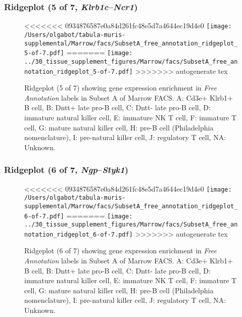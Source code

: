 \subsubsection{Ridgeplot (5 of 7, \emph{Klrb1c}--\emph{Ncr1})}
\begin{figure}[h]
\centering
<<<<<<< 0934876587e0a84d261fc48e5d7a4644ec19d4e0
\texttt{[image: /Users/olgabot/tabula-muris-supplemental/Marrow/facs/SubsetA\_free\_annotation\_ridgeplot\_5-of-7.pdf]}
=======
\texttt{[image: ../30\_tissue\_supplement\_figures/Marrow/facs/SubsetA\_free\_annotation\_ridgeplot\_5-of-7.pdf]}
>>>>>>> autogenerate tex

\caption{ Ridgeplot (5 of 7)  showing gene expression enrichment in \emph{Free Annotation} labels in Subset A of Marrow FACS. A: Cd3e+ Klrb1+ B cell, B: Dntt+ late pro-B cell, C: Dntt- late pro-B cell, D: immature natural killer cell, E: immature NK T cell, F: immature T cell, G: mature natural killer cell, H: pre-B cell (Philadelphia nomenclature), I: pre-natural killer cell, J: regulatory T cell, NA: Unknown.}
\end{figure}


\clearpage

\subsubsection{Ridgeplot (6 of 7, \emph{Ngp}--\emph{Styk1})}
\begin{figure}[h]
\centering
<<<<<<< 0934876587e0a84d261fc48e5d7a4644ec19d4e0
\texttt{[image: /Users/olgabot/tabula-muris-supplemental/Marrow/facs/SubsetA\_free\_annotation\_ridgeplot\_6-of-7.pdf]}
=======
\texttt{[image: ../30\_tissue\_supplement\_figures/Marrow/facs/SubsetA\_free\_annotation\_ridgeplot\_6-of-7.pdf]}
>>>>>>> autogenerate tex

\caption{ Ridgeplot (6 of 7)  showing gene expression enrichment in \emph{Free Annotation} labels in Subset A of Marrow FACS. A: Cd3e+ Klrb1+ B cell, B: Dntt+ late pro-B cell, C: Dntt- late pro-B cell, D: immature natural killer cell, E: immature NK T cell, F: immature T cell, G: mature natural killer cell, H: pre-B cell (Philadelphia nomenclature), I: pre-natural killer cell, J: regulatory T cell, NA: Unknown.}
\end{figure}


\clearpage

